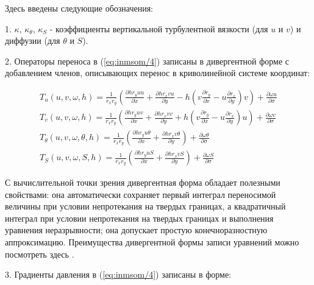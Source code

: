 	Здесь введены следующие обозначения:
	
	1. $\kappa$, $\kappa_\theta$, $\kappa_S$ - коэффициенты вертикальной турбулентной вязкости (для $u$ и $v$) и диффузии (для $\theta$ и $S$).

	2. Операторы переноса в (\ref{eq:inmsom/4}) записаны в дивергентной форме
	с добавлением членов, описывающих перенос в криволинейной системе координат:

	\begin{equation} \label{eq:inmsom/5} 
	\begin{array}{c} 
	\displaystyle{T_{u} (u,v,\omega ,h) = \frac{1}{r_x r_y} \left( \frac{\partial hr_{y} uu}{\partial x} + \frac{\partial hr_{x} vu}{\partial y} - h\left(v\frac{\partial r_{y} }{\partial x} - u\frac{\partial r_{x} }{\partial y} \right)v \right) + \frac{\partial \omega u}{\partial \sigma } }\\ 
	
	\displaystyle{T_{v} (u,v,\omega ,h) = \frac{1}{r_x r_y} \left( \frac{\partial hr_{y} uv}{\partial x} + \frac{\partial hr_{x} vv}{\partial y} + h\left(v\frac{\partial r_{y} }{\partial x} - u\frac{\partial r_{x} }{\partial y} \right)u \right) + \frac{\partial \omega v}{\partial \sigma } } \\ 
	
	\displaystyle{T_{\theta } (u,v,\omega ,\theta ,h) = \frac{1}{r_x r_y} \left( \frac{\partial hr_{y} u\theta }{\partial x} + \frac{\partial hr_{x} v\theta }{\partial y} \right) +\frac{\partial \omega \theta }{\partial \sigma } } \\ 
	
	\displaystyle{T_{S} (u,v,\omega ,S,h) = \frac{1}{r_x r_y} \left( \frac{\partial hr_{y} uS}{\partial x} + \frac{\partial hr_{x} vS}{\partial y} \right) +\frac{\partial \omega S}{\partial \sigma } } 
	\end{array} 
	\end{equation} 
	
	С вычислительной точки зрения дивергентная форма обладает полезными свойствами: она автоматически сохраняет первый интеграл переносимой величины при условии непротекания на твердых границах, а квадратичный интеграл 
	при условии непротекания на твердых границах и выполнения уравнения неразрывности; она допускает
	простую конечноразностную аппроксимацию.  
	Преимущества дивергентной формы записи уравнений можно посмотреть здесь \cite{ROUCH}.  

	3. Градиенты давления в (\ref{eq:inmsom/4}) записаны в форме:

